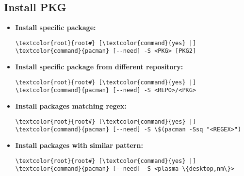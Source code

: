 \documentclass[10pt, a4paper, onecolumn, openany]{book} %
\begin{document}
\subsection{Install PKG}
\begin{itemize}
    \item \textbf{Install specific package:}
\begin{Verbatim}[commandchars=\\\{\}]
\textcolor{root}{root#} [\textcolor{command}{yes} |] \textcolor{command}{pacman} [--need] -S <PKG> [PKG2]
\end{Verbatim}
    \item \textbf{Install specific package from different repository:}
\begin{Verbatim}[commandchars=\\\{\}]
\textcolor{root}{root#} [\textcolor{command}{yes} |] \textcolor{command}{pacman} [--need] -S <REPO>/<PKG>
\end{Verbatim}
    \item \textbf{Install packages matching regex:}
\begin{Verbatim}[commandchars=\\\{\}]
\textcolor{root}{root#} [\textcolor{command}{yes} |] \textcolor{command}{pacman} [--need] -S \$(pacman -Ssq "<REGEX>")
\end{Verbatim}
    \item \textbf{Install packages with similar pattern:}
\begin{Verbatim}[commandchars=\\\{\}]
\textcolor{root}{root#} [\textcolor{command}{yes} |] \textcolor{command}{pacman} [--need] -S <plasma-\{desktop,nm\}>
\end{Verbatim}    
\end{itemize}
\end{document}
